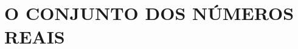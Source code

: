 \documentclass[../main.tex]{subfiles}
\begin{document}
\chapter{O CONJUNTO DOS NÚMEROS REAIS}
\end{document}
